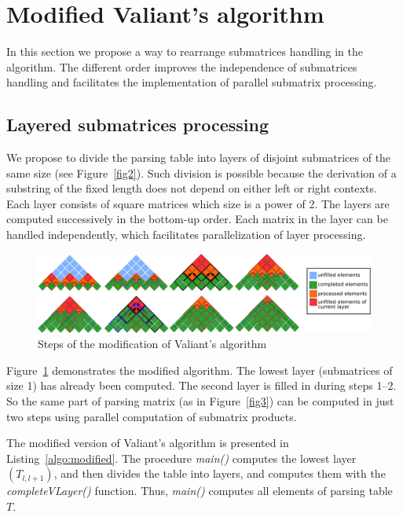 \section{Modified Valiant's algorithm}

In this section we propose a way to rearrange submatrices handling in the algorithm.
The different order improves the independence of submatrices handling and facilitates the implementation of parallel submatrix processing.

\subsection{Layered submatrices processing}

We propose to divide the parsing table into layers of disjoint submatrices of the same size (see Figure~\ref{fig2}).
Such division is possible because the derivation of a substring of the fixed length does not depend on either left or right contexts.
Each layer consists of square matrices which size is a power of 2.
The layers are computed successively in the bottom-up order.
Each matrix in the layer can be handled independently, which facilitates parallelization of layer processing.

\begin{figure}[h]
\vspace{3mm}
 \begin{center}
 \includegraphics[width=12cm]{pictures/modivis2.pdf}
    \caption{Steps of the modification of Valiant's algorithm}
    \label{fig4}
 \end{center}
\vspace{-8mm}
\end{figure}

Figure~\ref{fig4} demonstrates the modified algorithm.
The lowest layer (submatrices of size 1) has already been computed.
The second layer is filled in during steps 1--2.
So the same part of parsing matrix (as in Figure~\ref{fig3}) can be computed in just two steps using parallel computation of submatrix products.

The modified version of Valiant's algorithm is presented in Listing~\ref{algo:modified}.
The procedure \textit{main()} computes the lowest layer $(T_{l, l+1})$, and then divides the table into layers, and computes them with the \textit{completeVLayer()} function.
Thus, \textit{main()} computes all elements of parsing table $T$.

